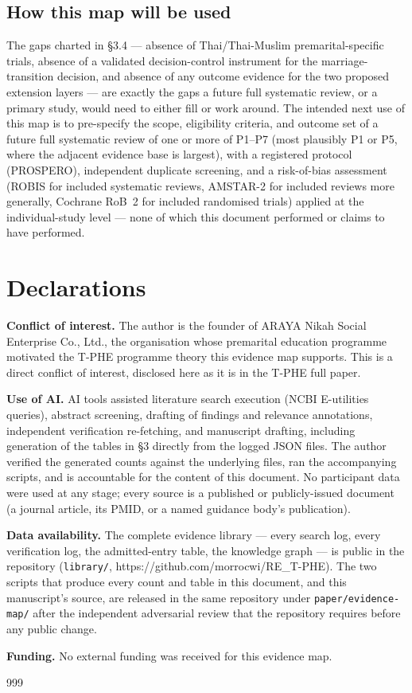 \documentclass[11pt]{article}
\newcommand{\tphe}{T\mbox{-}PHE}
\begin{document}
\subsection{How this map will be used}
The gaps charted in \S3.4 --- absence of Thai/Thai-Muslim premarital-specific trials, absence of a
validated decision-control instrument for the marriage-transition decision, and absence of any
outcome evidence for the two proposed extension layers --- are exactly the gaps a future full
systematic review, or a primary study, would need to either fill or work around. The intended next
use of this map is to pre-specify the scope, eligibility criteria, and outcome set of a future full
systematic review of one or more of P1--P7 (most plausibly P1 or P5, where the adjacent evidence
base is largest), with a registered protocol (PROSPERO), independent duplicate screening, and a
risk-of-bias assessment (ROBIS for included systematic reviews, AMSTAR-2 for included reviews more
generally, Cochrane RoB~2 for included randomised trials) applied at the individual-study level ---
none of which this document performed or claims to have performed.

\section*{Declarations}

\noindent\textbf{Conflict of interest.} The author is the founder of ARAYA Nikah Social Enterprise
Co., Ltd., the organisation whose premarital education programme motivated the \tphe{} programme
theory this evidence map supports. This is a direct conflict of interest, disclosed here as it is
in the \tphe{} full paper.

\noindent\textbf{Use of AI.} AI tools assisted literature search execution (NCBI E-utilities
queries), abstract screening, drafting of findings and relevance annotations, independent
verification re-fetching, and manuscript drafting, including generation of the tables in
\S3 directly from the logged JSON files. The author verified the generated counts against the
underlying files, ran the accompanying scripts, and is accountable for the content of this
document. No participant data were used at any stage; every source is a published or
publicly-issued document (a journal article, its PMID, or a named guidance body's publication).

\noindent\textbf{Data availability.} The complete evidence library --- every search log, every
verification log, the admitted-entry table, the knowledge graph --- is public in the repository
(\texttt{library/}, https://github.com/morrocwi/RE\_T-PHE). The two scripts that produce every count
and table in this document, and this manuscript's source, are released in the same repository under
\texttt{paper/evidence-map/} after the independent adversarial review that the repository requires
before any public change.

\noindent\textbf{Funding.} No external funding was received for this evidence map.

\begin{thebibliography}{999}\footnotesize


\end{thebibliography}
\end{document}
